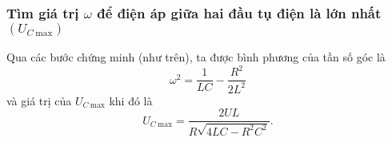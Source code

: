 \subsubsection{Tìm giá trị $\omega$ để điện áp giữa hai đầu tụ điện là lớn nhất $(U_{C\ \text{max}})$}
Qua các bước chứng minh (như trên), ta được bình phương của tần số góc là
\begin{equation*}
	\omega^2 = \dfrac{1}{LC}-\dfrac{R^2}{2L^2}
\end{equation*}
và giá trị của $U_{C\ \text {max}} $ khi đó là
\begin{equation*}
	U_{C\ \text{max}}=\dfrac{2UL}{R\sqrt{4LC-R^2C^2}}.
\end{equation*}

